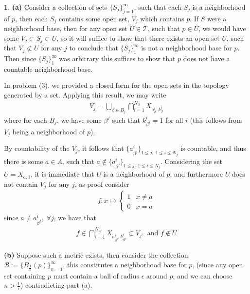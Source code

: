 \documentclass[10.5pt]{article}
\theoremstyle{definition}
\newtheorem{pb}{}
\newcommand{\set}[1]{\{#1\}}
\newcommand{\tand}{\text{ and }}
\begin{document}
    \begin{pb}
        \textbf{(a)} Consider a collection of sets \(\set{S_j}_{j=1}^\infty\), such that each \(S_j\) is a neighborhood of \(p\), then each \(S_j\) contains some open set, \(V_j\) which contains \(p\). If \(S\) were a neighborhood base, then for any open set \(U \in \mathcal{T}\), such that \(p \in U\), we would have some \(V_j \subset S_j \subset U\), so it will suffice to show that there exists an open set \(U\), such that \(V_j \not \subset U\) for any \(j\) to conclude that \(\set{S_j}_1^\infty\) is not a neighborhood base for \(p\). Then since \(\set{S_j}_1^\infty\) was arbitrary this suffices to show that \(p\) does not have a countable neighborhood base.

        In problem (3), we provided a closed form for the open sets in the topology generated by a set. Applying this result, we may write
        \begin{align*}
            V_j = \bigcup_{\beta \in B_j}\bigcap_{i = 1}^{N_{\beta}} X_{a^i_{\beta},k^i_{\beta}}
        \end{align*}
        where for each \(B_j\), we have some \(\beta^j\) such that \(k^i_{\beta^j} = 1\) for all \(i\) (this follows from \(V_j\) being a neighborhood of \(p\)).

        By countability of the \(V_j\), it follows that \(\set{a^i_{\beta^j}}_{1 \leq j, \; 1 \leq i \leq N_j}\) is countable, and thus there is some \(a \in A\), such that \(a \not \in \set{a^i_{\beta^j}}_{1 \leq j, \; 1 \leq i \leq N_j}\). Considering the set \(U = X_{a,1}\), it is immediate that \(U\) is a neighborhood of \(p\), and furthermore \(U\) does not contain \(V_j\) for any \(j\), as proof consider
        \begin{align*}
            f:x \mapsto \begin{cases}
                1 & x \neq a \\
                0 & x = a
            \end{cases}
        \end{align*}
        since \(a \neq a^i_{\beta^j}, \; \forall j\), we have that
        \begin{align*}
            f \in \bigcap_{i = 1}^{N_{\beta^j}} X_{a^i_{\beta^j},k^i_{\beta^j}} \subset V_j, \tand
            f \not \in U
        \end{align*}

        \textbf{(b)} Suppose such a metric exists, then consider the collection
            \(\mathcal{B} := \set{B_{\frac{1}{n}}(p)}_{n=1}^\infty\), this constitutes a neighborhood base for \(p\), (since any open set containing \(p\) must contain a ball of radius \(\epsilon\) around \(p\), and we can choose \(n > \frac{1}{\epsilon}\)) contradicting part (a).


\end{pb}
\end{document}
